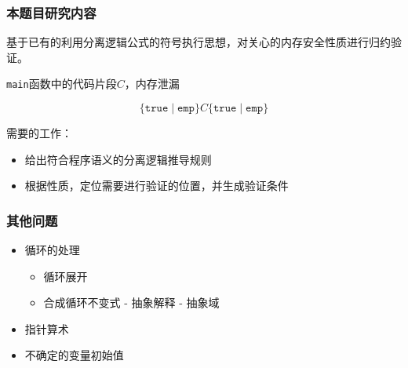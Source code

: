 \documentclass[11pt]{beamer}
\begin{document}
\begin{frame}\frametitle{本题目研究内容}
基于已有的利用分离逻辑公式的符号执行思想，对关心的内存安全性质进行归约验证。
\begin{example}
\texttt{main}函数中的代码片段$C$，内存泄漏

\[\{\texttt{true}\mid \texttt{emp}\} C \{\texttt{true}\mid \texttt{emp}\}\]
\end{example}
需要的工作：
\begin{itemize}
\item 给出符合程序语义的分离逻辑推导规则
\item 根据性质，定位需要进行验证的位置，并生成验证条件
\end{itemize}
\end{frame}

\begin{frame}\frametitle{其他问题}
\begin{itemize}
\item 循环的处理
\begin{itemize}
\item 循环展开
\item 合成循环不变式 - 抽象解释 - 抽象域
\end{itemize}
\item 指针算术
\item 不确定的变量初始值
\end{itemize}
\end{frame}

\begin{frame}

\end{frame}
\end{document}
